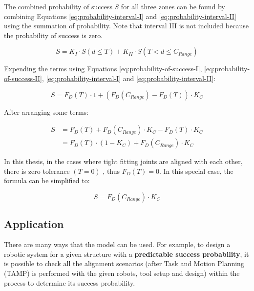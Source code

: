 The combined probability of success $S$ for all three zones can be found by combining Equations \ref{eq:probability-interval-I} and \ref{eq:probability-interval-II} using the summation of probability. Note that interval \textrm{III} is not included because the probability of success is zero.

\begin{equation} \label{eq:probability-of-three-intervals}
    S = K_I \cdot S(d \le T) + K_{II} \cdot S(T < d \le C_{Range})
\end{equation}

Expending the terms using Equations \ref{eq:probability-of-success-I}, \ref{eq:probability-of-success-II}, \ref{eq:probability-interval-I} and \ref{eq:probability-interval-II}:

\begin{equation} \label{eq:probability-expanded}
    S = F_D(T) \cdot 1 + (F_D (C_{Range}) - F_D(T)) \cdot K_C
\end{equation}

After arranging some terms:

\begin{align} \label{eq:probability-expanded-rearranged}
    S &= F_D(T) + F_D (C_{Range}) \cdot K_C - F_D(T) \cdot K_C \nonumber \\
      &= F_D(T) \cdot (1 - K_C) + F_D(C_{Range}) \cdot K_C
\end{align}

In this thesis, in the cases where tight fitting joints are aligned with each other, there is zero tolerance $(T = 0)$ , thus $F_D(T) = 0$. In this special case, the formula can be simplified to:

\begin{equation} \label{eq:probability-when-zero-tolerance}
    S = F_D(C_{Range}) \cdot K_C
\end{equation}

\subsection{Application}
\label{subsection:new-hypo-model-application}

There are many ways that the model can be used. For example, to design a robotic system for a given structure with a \textbf{predictable success probability}, it is possible to check all the alignment scenarios (after Task and Motion Planning (TAMP) is performed with the given robots, tool setup and design) within the process to determine its success probability.

